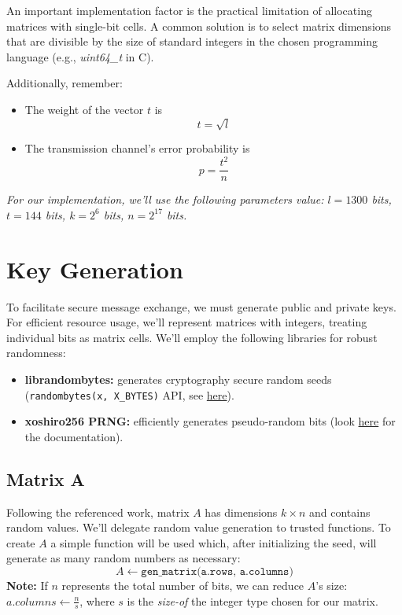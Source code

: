An important implementation factor is the practical limitation of allocating matrices with single-bit cells. A common solution is to select matrix dimensions that are divisible by the size of standard integers in the chosen programming language (e.g., \textit{uint64\_t} in C). 

Additionally, remember:
\begin{itemize}
    \item The weight of the vector $t$ is $$t = \sqrt{l}$$
    \item The transmission channel's error probability is $$p = \frac{t^2}{n}$$
\end{itemize}

\textit{For our implementation, we'll use the following parameters value: $l = 1300$ bits, $t = 144$ bits, $k = 2^{6}$ bits, $n = 2^{17}$ bits.}

\section{Key Generation}

To facilitate secure message exchange, we must generate public and private keys. For efficient resource usage, we'll represent matrices with integers, treating individual bits as matrix cells. We'll employ the following libraries for robust randomness:
\begin{itemize}
    \item \textbf{librandombytes:} generates cryptography secure random seeds (\texttt{randombytes(x, X\_BYTES)} API, see \href{https://randombytes.cr.yp.to/index.html}{here}).
    \item \textbf{xoshiro256 PRNG:} efficiently generates pseudo-random bits (look \href{https://prng.di.unimi.it}{here} for the documentation).
\end{itemize}

\subsection{Matrix A}

Following the referenced work, matrix $A$ has dimensions $k \times n$ and contains random values. We'll delegate random value generation to trusted functions. To create $A$ a simple function will be used which, after initializing the seed, will generate as many random numbers as necessary:
$$
A \leftarrow \texttt{gen\_matrix(a.rows, a.columns)}
$$ 
\textbf{Note:} If $n$ represents the total number of bits, we can reduce $A$'s size:
$a.columns \leftarrow \frac{n}{s}$, where $s$ is the \textit{size-of} the integer type chosen for our matrix.

